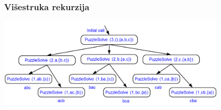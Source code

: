 \documentclass[compress]{beamer}
\begin{document}
\begin{frame}[fragile]
  \frametitle{Višestruka rekurzija}
  \begin{center}
    \includegraphics[width=11cm]{asp-02-pic09.png}
  \end{center}
\end{frame}
\end{document}
